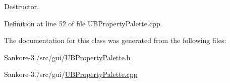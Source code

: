 Destructor. 



Definition at line 52 of file U\-B\-Property\-Palette.\-cpp.



The documentation for this class was generated from the following files\-:\begin{DoxyCompactItemize}
\item 
Sankore-\/3./src/gui/\hyperlink{_u_b_property_palette_8h}{U\-B\-Property\-Palette.\-h}\item 
Sankore-\/3./src/gui/\hyperlink{_u_b_property_palette_8cpp}{U\-B\-Property\-Palette.\-cpp}\end{DoxyCompactItemize}
